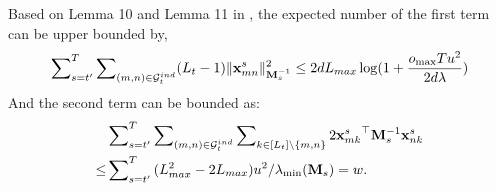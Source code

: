 


 
Based on Lemma 10 and Lemma 11 in \cite{abbasi2011improved}, the expected number of the first term can be upper bounded by,
\small
\begin{align*}
    \sum\nolimits_{s=t^\prime}^T\sum\nolimits_{(m, n) \in \mathcal{G}_t^{ind}} (L_t - 1)\Vert{\mathbf{x}_{mn}^s}\Vert_{\mathbf{M}_s^{-1}}^2 \leq 2dL_{max}\log(1 + \frac{o_{\max}Tu^2}{2d\lambda})
\end{align*}
\normalsize
And the second term can be bounded as:
\small
\begin{align*}
    &\sum\nolimits_{s=t^\prime}^T\sum\nolimits_{(m, n) \in \mathcal{G}_t^{ind}}\sum\nolimits_{k\in [L_t] \setminus \{m, n\} } 2{\mathbf{x}_{mk}^s}^\top\mathbf{M}_s^{-1}\mathbf{x}_{nk}^s \\
    \leq & \sum\nolimits_{s=t^\prime}^T {(L_{max}^2 - 2L_{max})u^2 }/{\lambda_{\min}(\mathbf{M}_s)} = w.
\end{align*}
\normalsize

